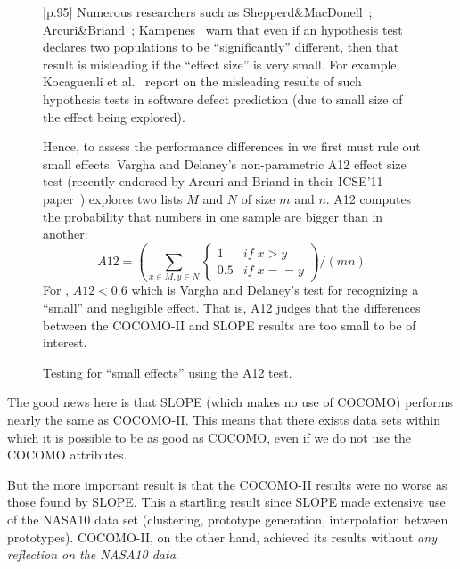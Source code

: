 \begin{figure}[!b]
\small
\begin{tabular}{|p{.95\linewidth}|}\hline
Numerous researchers such as 
Shepperd\&MacDonell~\cite{shepperd12a}; Arcuri\&Briand~\cite{arcuri11}; Kampenes~\cite{kampenes07}  warn that even if an
hypothesis test declares two populations to be
``significantly'' different, then that result is
misleading if the ``effect size'' is very small. For
example, Kocaguenli et al.~\cite{kocharm13} report on the misleading
results of such hypothesis tests in software defect
prediction (due to small size of the effect being
explored).

Hence, to assess 
the performance differences in 
we first must rule out small effects.
Vargha and Delaney's
non-parametric 
A12 effect size test (recently 
endorsed by Arcuri and Briand
in their ICSE'11 paper~\cite{arcuri11})
explores
two lists $M$ and $N$ of size $m$ and $n$.
A12 computes the probability that numbers in one sample are bigger than in another:
\[A12 = \left(\sum_{x\in M, y \in N} 
\begin{cases} 
1   & \mathit{if}\; x > y\\
0.5 & \mathit{if}\; x == y
\end{cases}\right) / (mn)
\]
For ,  $A12 < 0.6$ 
which is 
Vargha and Delaney's test for recognizing  a ``small'' and negligible effect.
That is, A12 judges that  the differences between the COCOMO-II and SLOPE results
are too small to be of interest.\\\hline
\end{tabular}
\caption{Testing for ``small effects'' using the A12 test.}\label{fig:a12}
\end{figure}


The good news here is that SLOPE (which makes no use
of COCOMO) performs nearly the same as COCOMO-II. This means
that there exists data sets within which it is
possible to be as good as COCOMO, even if we do not
use the COCOMO attributes.

But the more  important result is that the
\mbox{COCOMO-II} results were no worse as those found by SLOPE. This
a startling result since SLOPE made extensive use of the NASA10 data set
(clustering, prototype generation, interpolation between prototypes).
COCOMO-II, on the other hand,  achieved its results without {\em any reflection  on the NASA10 data}.
